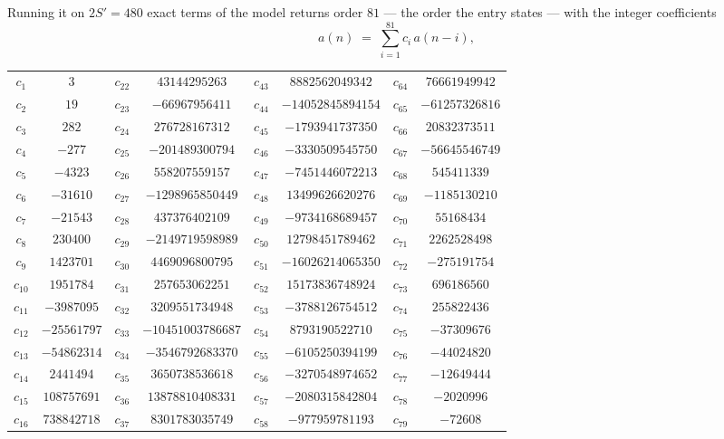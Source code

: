 \documentclass[11pt,a4paper]{article}
\theoremstyle{plain}
\theoremstyle{definition}
\begin{document}
Running it on $2S'=480$ exact terms of the model returns order $81$ --- the order the
entry states --- with the integer coefficients
\[
a(n)\;=\;\sum_{i=1}^{81}c_i\,a(n-i),
\]
\begin{center}\small
\begin{tabular}{cccccccc}
$c_{1}$ & $3$ & $c_{22}$ & $43144295263$ & $c_{43}$ & $8882562049342$ & $c_{64}$ & $76661949942$ \\
$c_{2}$ & $19$ & $c_{23}$ & $-66967956411$ & $c_{44}$ & $-14052845894154$ & $c_{65}$ & $-61257326816$ \\
$c_{3}$ & $282$ & $c_{24}$ & $276728167312$ & $c_{45}$ & $-1793941737350$ & $c_{66}$ & $20832373511$ \\
$c_{4}$ & $-277$ & $c_{25}$ & $-201489300794$ & $c_{46}$ & $-3330509545750$ & $c_{67}$ & $-56645546749$ \\
$c_{5}$ & $-4323$ & $c_{26}$ & $558207559157$ & $c_{47}$ & $-7451446072213$ & $c_{68}$ & $545411339$ \\
$c_{6}$ & $-31610$ & $c_{27}$ & $-1298965850449$ & $c_{48}$ & $13499626620276$ & $c_{69}$ & $-1185130210$ \\
$c_{7}$ & $-21543$ & $c_{28}$ & $437376402109$ & $c_{49}$ & $-9734168689457$ & $c_{70}$ & $55168434$ \\
$c_{8}$ & $230400$ & $c_{29}$ & $-2149719598989$ & $c_{50}$ & $12798451789462$ & $c_{71}$ & $2262528498$ \\
$c_{9}$ & $1423701$ & $c_{30}$ & $4469096800795$ & $c_{51}$ & $-16026214065350$ & $c_{72}$ & $-275191754$ \\
$c_{10}$ & $1951784$ & $c_{31}$ & $257653062251$ & $c_{52}$ & $15173836748924$ & $c_{73}$ & $696186560$ \\
$c_{11}$ & $-3987095$ & $c_{32}$ & $3209551734948$ & $c_{53}$ & $-3788126754512$ & $c_{74}$ & $255822436$ \\
$c_{12}$ & $-25561797$ & $c_{33}$ & $-10451003786687$ & $c_{54}$ & $8793190522710$ & $c_{75}$ & $-37309676$ \\
$c_{13}$ & $-54862314$ & $c_{34}$ & $-3546792683370$ & $c_{55}$ & $-6105250394199$ & $c_{76}$ & $-44024820$ \\
$c_{14}$ & $2441494$ & $c_{35}$ & $3650738536618$ & $c_{56}$ & $-3270548974652$ & $c_{77}$ & $-12649444$ \\
$c_{15}$ & $108757691$ & $c_{36}$ & $13878810408331$ & $c_{57}$ & $-2080315842804$ & $c_{78}$ & $-2020996$ \\
$c_{16}$ & $738842718$ & $c_{37}$ & $8301783035749$ & $c_{58}$ & $-977959781193$ & $c_{79}$ & $-72608$ \\

\end{tabular}
\end{center}
\end{document}
